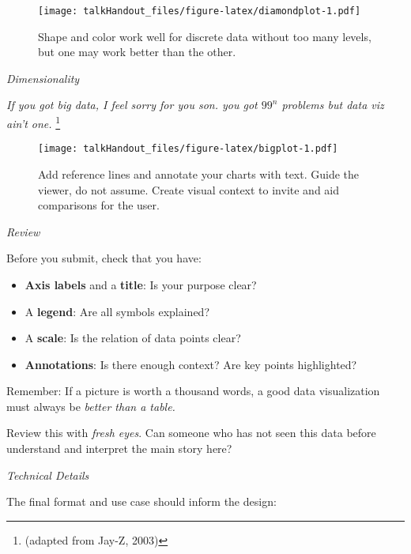 \documentclass{tufte-handout}
\begin{document}
\begin{figure*}
 \texttt{[image: talkHandout\_files/figure-latex/diamondplot-1.pdf]}
\caption{Shape and color work well for discrete data without too many levels, but one may work better than the other.}
\end{figure*}
\clearpage
\noindent \emph{Dimensionality}

\noindent \emph{If you got big data, I feel sorry for you son. you got \(99^{n}\)
problems but data viz ain't one.} \footnote{(adapted from Jay-Z, 2003)}

\begin{figure*}
 \texttt{[image: talkHandout\_files/figure-latex/bigplot-1.pdf]}
\caption{Add reference lines and annotate your charts with text. Guide the viewer, do not assume. Create visual context to invite and aid comparisons for the user.}
\end{figure*}

\noindent \emph{Review}

\noindent Before you submit, check that you have:

\begin{itemize}
\itemsep1pt\parskip0pt
\item
  \textbf{Axis labels} and a \textbf{title}: Is your purpose clear?
\item
  A \textbf{legend}: Are all symbols explained?
\item
  A \textbf{scale}: Is the relation of data points clear?
\item
  \textbf{Annotations}: Is there enough context? Are key points
  highlighted?
\end{itemize}

\noindent Remember: If a picture is worth a thousand words, a good data
visualization must always be \emph{better than a table.}

\vspace{2.5mm}

\noindent Review this with \emph{fresh eyes}. Can someone who has not
seen this data before understand and interpret the main story here?

\vspace{2.5mm}
\noindent \emph{Technical Details}

\noindent The final format and use case should inform the design:
\end{document}
